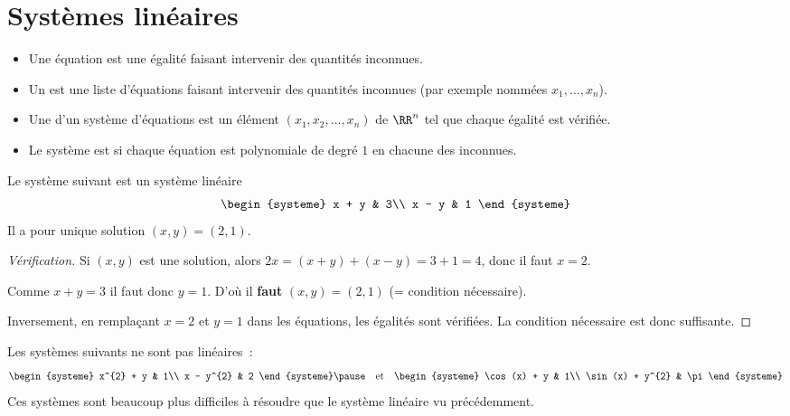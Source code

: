 \section{Systèmes linéaires}
\begin{frame}
\begin{definition}
  \begin{itemize}[<+->]
  \item Une équation est une égalité faisant intervenir des quantités inconnues.
  \item Un  est une liste d'équations faisant intervenir des quantités inconnues (par exemple nommées \(x_{1},\ldots, x_{n}\)).
  \item Une  d'un système d'équations est un élément \((x_{1}, x_{2}, \ldots, x_{n})\) de \(\RR^{n}\) tel que chaque égalité est vérifiée.
  \item Le système est  si chaque équation est polynomiale de degré \(1\) en chacune des inconnues.
  \end{itemize}
\end{definition}
\end{frame}
\begin{frame}
\begin{example}
  Le système suivant est un système linéaire
  \begin{equation*}
    \begin{systeme}
      x + y & 3\\
      x - y & 1
    \end{systeme}
  \end{equation*}\pause{}
  Il a pour unique solution \((x,y) = (2,1)\).\pause{}
\end{example}
\begin{proof}[Vérification]\pause{}
  Si \((x,y)\) est une solution, alors \(2x = (x+y) + (x-y) = 3 + 1 = 4\), donc il faut \(x = 2\).\pause{}

  Comme \(x + y = 3\) il faut donc \(y = 1\).\pause{} D'où il \textbf{faut} \((x,y) = (2,1)\) (= condition nécessaire).\pause{}

  Inversement, en remplaçant \(x = 2\) et \(y = 1\) dans les équations\pause{}, les égalités sont vérifiées. La condition nécessaire est donc suffisante.
\end{proof}
\end{frame}

\begin{frame}
Les systèmes suivants ne sont pas linéaires~:\pause{}
\begin{equation*}
  \begin{systeme}
    x^{2} + y & 1\\
    x - y^{2} & 2
  \end{systeme}\pause
  \quad \text{et}\quad
  \begin{systeme}
    \cos(x) + y & 1\\ \sin(x) + y^{2} & \pi
  \end{systeme}
\end{equation*}\pause{}
Ces systèmes sont beaucoup plus difficiles à résoudre que le système linéaire vu précédemment.
\end{frame}


